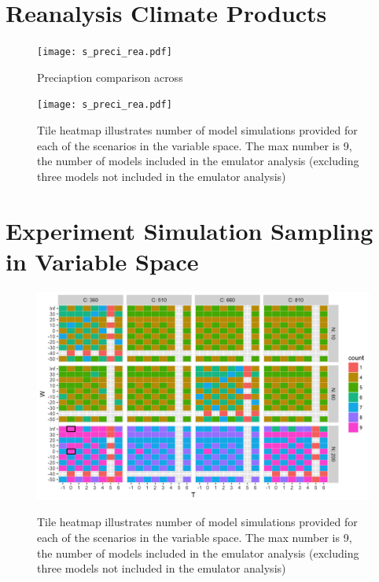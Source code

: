 \documentclass[10pt]{article}
\begin{document}
\clearpage
\section{Reanalysis Climate Products}
\begin{figure}[h!]
\texttt{[image: s\_preci\_rea.pdf]}\\
\caption{Preciaption comparison across }
\label{fig:precip_rea}
\end{figure}

\begin{figure}[h!]
\texttt{[image: s\_preci\_rea.pdf]}\\
\caption{Tile heatmap illustrates number of model simulations provided for each of the scenarios in the variable space. The max number is 9, the number of models included in the emulator analysis (excluding three models not included in the emulator analysis)}
\label{fig:precip_rea}
\end{figure}


\clearpage





\section{Experiment Simulation Sampling in Variable Space}
\begin{figure}[h!]
\includegraphics[width=\textwidth]{s_how_many_simulations.png}\\
\caption{Tile heatmap illustrates number of model simulations provided for each of the scenarios in the variable space. The max number is 9, the number of models included in the emulator analysis (excluding three models not included in the emulator analysis)}
\label{fig:numbersims}
\end{figure}
\end{document}
